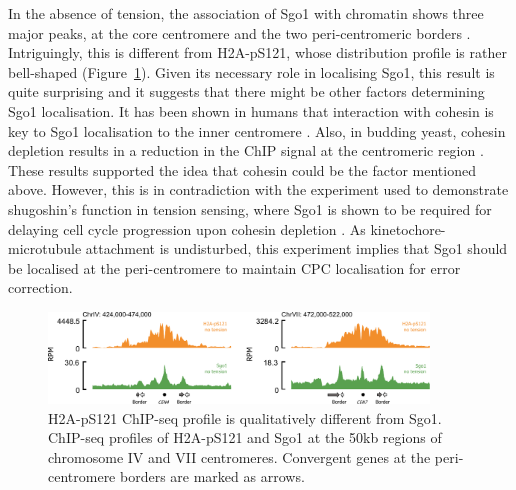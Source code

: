 In the absence of tension, the association of Sgo1 with chromatin shows three major peaks, at the core centromere and the two peri-centromeric borders \citep{Verzijlbergen2014, Paldi2020ConvergentPericentromeres}. Intriguingly, this is different from H2A-pS121, whose distribution profile is rather bell-shaped (Figure~\ref{fig:sgo1comparison}). Given its necessary role in localising Sgo1, this result is quite surprising and it suggests that there might be other factors determining Sgo1 localisation. It has been shown in humans that interaction with cohesin is key to Sgo1 localisation to the inner centromere \citep{Liu2013a}. Also, in budding yeast, cohesin depletion results in a reduction in the ChIP signal at the centromeric region \citep{Verzijlbergen2014}. These results supported the idea that cohesin could be the factor mentioned above. However, this is in contradiction with the experiment used to demonstrate shugoshin's function in tension sensing, where Sgo1 is shown to be required for delaying cell cycle progression upon cohesin depletion \citep{Indjeian2005a}. As kinetochore-microtubule attachment is undisturbed, this experiment implies that Sgo1 should be localised at the peri-centromere to maintain CPC localisation for error correction. 

\begin{figure}[htbp]
  \centering
  \includegraphics[width=0.9\textwidth]{chapter3/figures/Sgo1 comparison.pdf}
  \caption[H2A-pS121 ChIP-seq profile is qualitatively different from Sgo1]{H2A-pS121 ChIP-seq profile is qualitatively different from Sgo1. ChIP-seq profiles of H2A-pS121 and Sgo1 \citep{Paldi2020ConvergentPericentromeres} at the 50kb regions of chromosome IV and VII centromeres. Convergent genes at the peri-centromere borders are marked as arrows. }
  \label{fig:sgo1comparison}
\end{figure}

